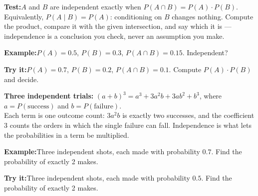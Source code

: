\documentclass[12pt]{article}
\begin{document}
\begin{formulabox}\textbf{Test:}\quad $A$ and $B$ are independent exactly when
$P(A \cap B) = P(A) \cdot P(B)$.\\[4pt]
Equivalently, $P(A \mid B) = P(A)$: conditioning on $B$ changes nothing. Compute the
product, compare it with the given intersection, and say which it is --- independence is
a conclusion you check, never an assumption you make.
\end{formulabox}
\begin{examplebox}\textbf{Example:}\quad $P(A) = 0.5$, $P(B) = 0.3$, $P(A \cap B) = 0.15$.
Independent?
\end{examplebox}
\begin{tryitbox}\textbf{Try it:}\quad $P(A) = 0.7$, $P(B) = 0.2$, $P(A \cap B) = 0.1$.
Compute $P(A) \cdot P(B)$ and decide.\\[2pt]
\end{tryitbox}

\begin{formulabox}\textbf{Three independent trials:}\quad
$(a+b)^3 = a^3 + 3a^2b + 3ab^2 + b^3$, where $a = P(\text{success})$ and $b = P(\text{failure})$.\\[4pt]
Each term is one outcome count: $3a^2b$ is exactly two successes, and the coefficient 3
counts the orders in which the single failure can fall. Independence is what lets the
probabilities in a term be multiplied.
\end{formulabox}
\begin{examplebox}\textbf{Example:}\quad Three independent shots, each made with
probability $0.7$. Find the probability of exactly 2 makes.
\end{examplebox}
\begin{tryitbox}\textbf{Try it:}\quad Three independent shots, each made with probability
$0.5$. Find the probability of exactly 2 makes.\\[2pt]
\end{tryitbox}
\end{document}
